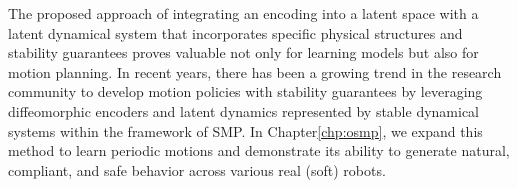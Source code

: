 The proposed approach of integrating an encoding into a latent space with a latent dynamical system that incorporates specific physical structures and stability guarantees proves valuable not only for learning models but also for motion planning. In recent years, there has been a growing trend in the research community to develop motion policies with stability guarantees by leveraging diffeomorphic encoders and latent dynamics represented by stable dynamical systems within the framework of \gls{SMP}\cite{rana2020euclideanizing, perez2023stable, zhi2024teaching}. In Chapter\ref{chp:osmp}, we expand this method to learn periodic motions and demonstrate its ability to generate natural, compliant, and safe behavior across various real (soft) robots.

